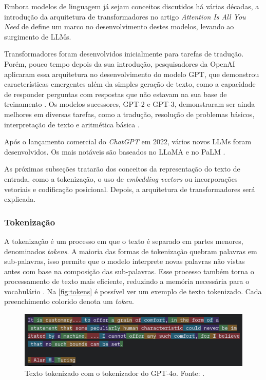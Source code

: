 Embora modelos de linguagem já sejam conceitos discutidos há várias décadas, a introdução da arquitetura de transformadores no artigo \textit{Attention Is All You Need}
de \textcite{transformer} define um marco no desenvolvimento destes modelos, levando ao surgimento de \acp{LLM}.

Transformadores foram desenvolvidos inicialmente para tarefas de tradução. Porém, pouco tempo depois da sua introdução, pesquisadores da OpenAI aplicaram essa arquitetura
no desenvolvimento do modelo \ac{GPT}, que demonstrou características emergentes além da simples geração de texto, como a capacidade de responder perguntas com
respostas que não estavam na sua base de treinamento \cite{gpt1}. Os modelos sucessores, \ac{GPT}-2 e \ac{GPT}-3, demonstraram ser ainda melhores em diversas tarefas,
como a tradução, resolução de problemas básicos, interpretação de texto e aritmética básica \cite{gpt2, gpt3}.

Após o lançamento comercial do \textit{ChatGPT} em 2022, vários novos \acp{LLM} foram desenvolvidos. Os mais notáveis são baseados no \ac{LLaMA} e no \ac{PaLM}
\cite{llm_survey_2024}.

As próximas subseções tratarão dos conceitos da representação do texto de entrada, como a tokenização, o uso de \textit{embedding vectors} ou incorporações vetoriais e
codificação posicional. Depois, a arquitetura de transformadores será explicada.

\subsubsection{Tokenização}

A tokenização é um processo em que o texto é separado em partes menores, denominados \textit{tokens}. A maioria das formas de tokenização quebram palavras em
sub-palavras, isso permite que o modelo interprete novas palavras não vistas antes com base na composição das sub-palavras. Esse processo também torna o processamento de
texto mais eficiente, reduzindo a memória necessária para o vocabulário \cite{tokenizer_performance}. Na \autoref{fig:tokens} é possível ver um exemplo de texto
tokenizado. Cada preenchimento colorido denota um \textit{token}.

\clearpage

\begin{figure}[ht]
      \centering
      \includegraphics[width=0.7\columnwidth,keepaspectratio]{images/tokens.png}
      \caption{\small Texto tokenizado com o tokenizador do \ac{GPT}-4o. Fonte: \textcite{tokenizer}.}
      \label{fig:tokens}
\end{figure}

